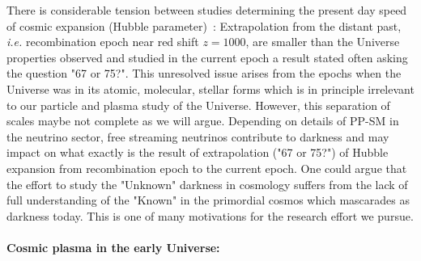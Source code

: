 {There is considerable tension between studies determining the present day speed of cosmic expansion (Hubble parameter)~\cite{DiValentino:2024spr,DiValentino:2021izs}: Extrapolation from the distant past, {\it i.e.\/} recombination epoch near red shift $z=1000$, are smaller than the Universe properties observed and studied in the current epoch a result stated often asking the question "67 or 75?". This unresolved issue arises from the epochs when the Universe was in its atomic, molecular, stellar forms which is in principle irrelevant to our particle and plasma study of the Universe. However, this separation of scales maybe not complete as we will argue. Depending on details of PP-SM in the neutrino sector, free streaming neutrinos contribute to darkness and may impact on what exactly is the result of extrapolation ("67 or 75?") of Hubble expansion from recombination epoch to the current epoch. One could argue that the effort to study the "Unknown" darkness in cosmology suffers from the lack of full understanding of the "Known" in the primordial cosmos which mascarades as darkness today. This is one of many motivations for the research effort we pursue. 

 
\paragraph{Cosmic plasma in the early Universe:}



}
